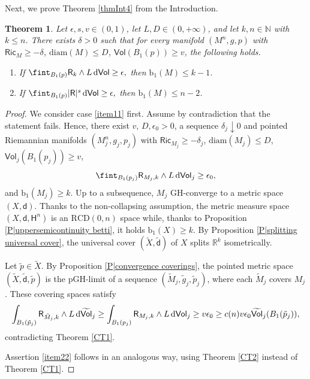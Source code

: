 \documentclass[10pt]{article}
\newtheorem{thm}{Theorem}[section]
\theoremstyle{definition}
\newcommand{\bb}[1]{\mathbb{#1}}
\newcommand{\ssf}[1]{\mathsf{#1}}
\newcommand{\Ric}{\mathsf{Ric}}
\newcommand{\aH}{\mathsf{H}}
\newcommand{\sd}{\mathsf{d}}
\newcommand{\R}{\mathsf{R}}
\newcommand{\de}{{\rm d}}
\begin{document}
Next, we prove Theorem \ref{thmInt4} from the Introduction. 

\begin{thm}
    Let $\epsilon,s,v \in (0,1)$, let $L,D \in (0,+\infty)$, and let $k,n \in \bb{N}$ with $k \leq n$. There exists $\delta>0$ such that for every manifold $(M^n,g,p)$ with
    $\Ric_{M} \geq -\delta$, $\mathrm{diam}(M) \leq D$, $\ssf{Vol}(B_1(p)) \geq v$, the following holds.
    \begin{enumerate}
    \item \label{item11} If
    $
     \fint_{B_1(p)} \R_{k} \wedge L \, \de \ssf{Vol} \geq \epsilon,
    $
    then $\mathrm{b}_1(M) \leq k-1$. 
        \item \label{item22} If
    $
     \fint_{B_1(p)} |\R|^s \, \de \ssf{Vol} \geq \epsilon,
    $
    then $\mathrm{b}_1(M) \leq n-2$. 
    \end{enumerate}
    \end{thm}
    
    \begin{proof}
We consider case \ref{item11} first. 
Assume by contradiction that the statement fails.
Hence, there exist $v,\, D, \epsilon_0>0$, a sequence  $\delta_j \downarrow 0$ and pointed Riemannian manifolds $(M^n_j,g_j,p_j)$ with $\Ric_{M_j} \geq -\delta_j$, $\mathrm{diam}(M_j) \leq D$, $\ssf{Vol}_j(B_1(p_j)) \geq v$, 
\[
\fint_{B_1(p_j)} \R_{M_j,k} \wedge L \, \de \ssf{Vol}_j \geq \epsilon_0,
\]
and $\mathrm{b}_1(M_j) \geq k$.
Up to a subsequence, $M_j$ GH-converge to a metric space $(X,\sd)$. 
Thanks to the non-collapsing assumption, the metric measure space $(X,\sd,\aH^n)$ is an $\mathrm{RCD}(0,n)$ space while, thanks to Proposition \ref{P|uppersemicontinuity betti}, it holds $\mathrm{b}_1(X) \geq k$.
By Proposition \ref{P|splitting universal cover}, the universal cover $(\tilde{X},\tilde{\sd})$ of $X$ splits $\bb{R}^k$ isometrically.


Let $\tilde{p} \in \tilde{X}$.
By Proposition \ref{P|convergence coverings}, the pointed metric space $(\tilde{X},\tilde{\sd},\tilde{p})$ is the  pGH-limit of a sequence $(\tilde{M}_j,\tilde{g}_j,\tilde{p}_j)$, where each $\tilde{M}_j$ covers $M_j$.
These covering spaces satisfy
\[
\int_{B_1(\tilde{p}_j)} {\R}_{\tilde{M}_j,k} \wedge L \, \de \widetilde{\ssf{Vol}}_j \geq 
\int_{B_1(p_j)} {\R}_{M_j,k} \wedge L \, \de \ssf{Vol}_j
\geq
v \epsilon_0 \geq c(n)v \epsilon_0 \widetilde{\ssf{Vol}}_j (B_1(\tilde{p}_j)),
\]
contradicting Theorem \ref{CT1}.

Assertion \ref{item22} follows in an analogous way, using Theorem \ref{CT2} instead of Theorem \ref{CT1}.
\end{proof}
\end{document}

